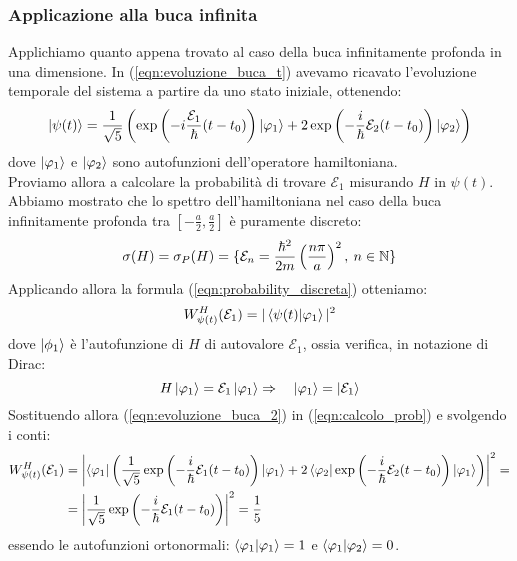 \documentclass[../../FisicaTeorica.tex]{subfiles}
\begin{document}
\subsubsection{Applicazione alla buca infinita}
Applichiamo quanto appena trovato al caso della buca infinitamente profonda in una dimensione. In (\ref{eqn:evoluzione_buca_t}) avevamo ricavato l'evoluzione temporale del sistema a partire da uno stato iniziale, ottenendo:
\begin{equation}
\ket{\psi(t)}=\frac{1}{\sqrt{5}}\left(\exp\left(-i\frac{\mathcal{E}_1}{\hbar}(t-t_0)\right)\ket{\varphi_1}
+ 2\exp \left(-\frac{i}{\hbar}\mathcal{E}_2(t-t_0)\right)\ket{\varphi_2}
 \right)
 \label{eqn:evoluzione_buca_2}
\end{equation}
dove $\ket{\varphi_1}$ e $\ket{\varphi_2}$ sono autofunzioni dell'operatore hamiltoniana.\\
Proviamo allora a calcolare la probabilità di trovare $\mathcal{E}_1$ misurando $H$ in $\psi(t)$.\\
Abbiamo mostrato che lo spettro dell'hamiltoniana nel caso della buca infinitamente profonda tra $[-\frac{a}{2},\frac{a}{2}]$ è puramente discreto:
\[
\sigma(H)=\sigma_P(H)=\{\mathcal{E}_n = \frac{\hbar^2}{2m}\left(\frac{n\pi}{a} \right)^2,\>n\in\mathbb{N}\}
\]
Applicando allora la formula (\ref{eqn:probability_discreta}) otteniamo:
\begin{equation}
W_{\psi(t)}^H(\mathcal{E}_1) = |\braket{\psi(t)|\varphi_1}|^2
\label{eqn:calcolo_prob}
\end{equation}
dove $\ket{\phi_1}$ è l'autofunzione di $H$ di autovalore $\mathcal{E}_1$, ossia verifica, in notazione di Dirac:
\[
H\ket{\varphi_1}=\mathcal{E}_1 \ket{\varphi_1}\Rightarrow \quad \ket{\varphi_1} = \ket{\mathcal{E}_1}
\]
Sostituendo allora (\ref{eqn:evoluzione_buca_2}) in (\ref{eqn:calcolo_prob}) e svolgendo i conti:
\begin{align*}
W_{\psi(t)}^H(\mathcal{E}_1) &= \left| \bra{\varphi_1}
\left (
\frac{1}{\sqrt{5}}\exp\left(-\frac{i}{\hbar}\mathcal{E}_1(t-t_0) \right)\ket{\varphi_1} +
2\bra{\varphi_2}\exp\left(-\frac{i}{\hbar}\mathcal{E}_2 (t-t_0)\right)\ket{\varphi_1}
\right) \right |^2 = \\
&= \left |\frac{1}{\sqrt{5}} \exp\left(-\frac{i}{\hbar} \mathcal{E}_1(t-t_0)\right) \right |^2=\frac{1}{5}
\end{align*}
essendo le autofunzioni ortonormali: $\braket{\varphi_1|\varphi_1}=1$ e $\braket{\varphi_1|\varphi_2}=0$.
\end{document}
